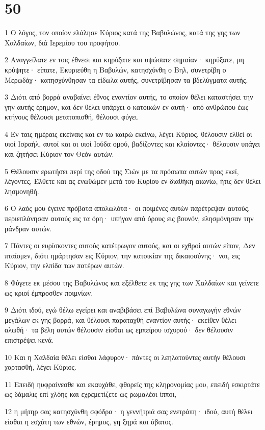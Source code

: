 \chapter{50}

\par 1 Ο λόγος, τον οποίον ελάλησε Κύριος κατά της Βαβυλώνος, κατά της γης των Χαλδαίων, διά Ιερεμίου του προφήτου.
\par 2 Αναγγείλατε εν τοις έθνεσι και κηρύξατε και υψώσατε σημαίαν· κηρύξατε, μη κρύψητε· είπατε, Εκυριεύθη η Βαβυλών, κατησχύνθη ο Βηλ, συνετρίβη ο Μερωδάχ· κατησχύνθησαν τα είδωλα αυτής, συνετρίβησαν τα βδελύγματα αυτής.
\par 3 Διότι από βορρά αναβαίνει έθνος εναντίον αυτής, το οποίον θέλει καταστήσει την γην αυτής έρημον, και δεν θέλει υπάρχει ο κατοικών εν αυτή· από ανθρώπου έως κτήνους θέλουσι μετατοπισθή, θέλουσι φύγει.
\par 4 Εν ταις ημέραις εκείναις και εν τω καιρώ εκείνω, λέγει Κύριος, θέλουσιν ελθεί οι υιοί Ισραήλ, αυτοί και οι υιοί Ιούδα ομού, βαδίζοντες και κλαίοντες· θέλουσιν υπάγει και ζητήσει Κύριον τον Θεόν αυτών.
\par 5 Θέλουσιν ερωτήσει περί της οδού της Σιών με τα πρόσωπα αυτών προς εκεί, λέγοντες, Έλθετε και ας ενωθώμεν μετά του Κυρίου εν διαθήκη αιωνίω, ήτις δεν θέλει λησμονηθή.
\par 6 Ο λαός μου έγεινε πρόβατα απολωλότα· οι ποιμένες αυτών παρέτρεψαν αυτούς, περιεπλάνησαν αυτούς εις τα όρη· υπήγαν από όρους εις βουνόν, ελησμόνησαν την μάνδραν αυτών.
\par 7 Πάντες οι ευρίσκοντες αυτούς κατέτρωγον αυτούς, και οι εχθροί αυτών είπον, Δεν πταίομεν, διότι ημάρτησαν εις Κύριον, την κατοικίαν της δικαιοσύνης· ναι, εις Κύριον, την ελπίδα των πατέρων αυτών.
\par 8 Φύγετε εκ μέσου της Βαβυλώνος και εξέλθετε εκ της γης των Χαλδαίων και γείνετε ως κριοί έμπροσθεν ποιμνίων.
\par 9 Διότι ιδού, εγώ θέλω εγείρει και αναβιβάσει επί Βαβυλώνα συναγωγήν εθνών μεγάλων εκ γης βορρά, και θέλουσι παραταχθή εναντίον αυτής· εκείθεν θέλει αλωθή· τα βέλη αυτών θέλουσιν είσθαι ως εμπείρου ισχυρού· δεν θέλουσιν επιστρέψει κενά.
\par 10 Και η Χαλδαία θέλει είσθαι λάφυρον· πάντες οι λεηλατούντες αυτήν θέλουσι χορτασθή, λέγει Κύριος.
\par 11 Επειδή ηυφραίνεσθε και εκαυχάθε, φθορείς της κληρονομίας μου, επειδή εσκιρτάτε ως δάμαλις επί χλόης και εχρεμετίζετε ως ρωμαλέοι ίπποι,
\par 12 η μήτηρ σας κατησχύνθη σφόδρα· η γεννήτριά σας ενετράπη· ιδού, αυτή θέλει είσθαι η εσχάτη των εθνών, έρημος, γη ξηρά και άβατος.
